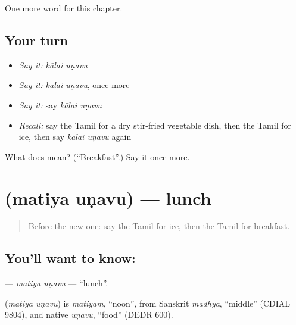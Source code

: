 \begin{grammarlens}[title={What you've built}]
One more word for this chapter.
\end{grammarlens}

\subsection*{Your turn}
\begin{itemize}
\raggedright
  \item \emph{Say it:} \emph{kālai uṇavu}
  \item \emph{Say it:} \emph{kālai uṇavu}, once more
  \item \emph{Say it:} say \emph{kālai uṇavu}
  \item \emph{Recall:} say the Tamil for a dry stir-fried vegetable dish, then the Tamil for ice, then say \emph{kālai uṇavu} again
\end{itemize}

\begin{tcolorbox}[breakable,colback=teal!4,colframe=teal!35!black,title={Before you move on}]
What does   mean? (\textquotedblleft{}Breakfast\textquotedblright{}.) Say it once more.
\end{tcolorbox}
\section[\texorpdfstring{\ta{மதிய} \ta{உணவு} (matiya uṇavu)}{மதிய உணவு (matiya uṇavu)}]{  (matiya uṇavu) — lunch}

\label{lesson:TA-C184-matiya-unavu}



\begin{quote}
Before the new one: say the Tamil for ice, then the Tamil for breakfast.
\end{quote}

\subsection*{You'll want to know:  }
\textbf{ } — \emph{matiya uṇavu} — \textquotedblleft{}lunch\textquotedblright{}.

\begin{cousinweb}
\textbf{ } (\emph{matiya uṇavu}) is \emph{matiyam}, \textquotedblleft{}noon\textquotedblright{}, from Sanskrit \emph{madhya}, \textquotedblleft{}middle\textquotedblright{} (CDIAL 9804), and native \emph{uṇavu}, \textquotedblleft{}food\textquotedblright{} (DEDR 600).
\end{cousinweb}

